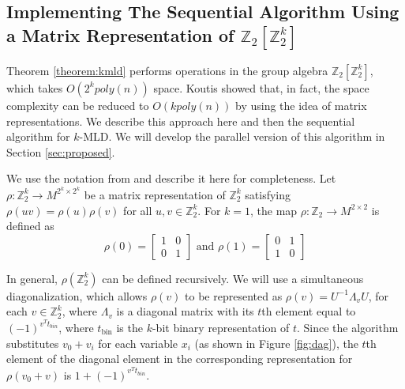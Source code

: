 

\subsection{Implementing The Sequential Algorithm Using a Matrix Representation
of $\mathbb{Z}_2[\mathbb{Z}_2^k]$}

Theorem \ref{theorem:kmld} performs operations in the group algebra $\mathbb{Z}_2[\mathbb{Z}_2^k]$,
which takes $O(2^k poly(n))$ space. Koutis \cite{koutis:icalp08} showed that, in fact, the space
complexity can be reduced to $O(k poly(n))$ by using the idea of matrix representations.
We describe this approach here and then the sequential algorithm \maxwt{}
for $k$-MLD. We will develop the parallel version of this algorithm in 
Section \ref{sec:proposed}.

We use the notation from \cite{koutis:icalp08} and describe it here for completeness.
Let $\rho:\mathbb{Z}_2^k\rightarrow M^{2^k\times 2^k}$ be a matrix representation of
$\mathbb{Z}_2^k$ satisfying $\rho(uv)=\rho(u)\rho(v)$ for all $u, v\in \mathbb{Z}_2^k$.
For $k=1$, the map $\rho:\mathbb{Z}_2\rightarrow M^{2\times 2}$ is defined as
\[
\rho(0) = 
\begin{bmatrix}
1 & 0\\
0 & 1
\end{bmatrix}
\mbox{ and }
\rho(1) = 
\begin{bmatrix}
0 & 1\\
1 & 0
\end{bmatrix}
\]

In general, $\rho(\mathbb{Z}_2^k)$ can be defined recursively. We will use a
simultaneous diagonalization, which allows $\rho(v)$ to be represented as
$\rho(v) = U^{-1}\Lambda_v U$, for each $v\in \mathbb{Z}_2^k$, where $\Lambda_v$ is
a diagonal matrix with its $t$th element equal to $(-1)^{v^T t_{bin}}$,
where $t_{\text{bin}}$ is the $k$-bit binary representation of $t$.
Since the algorithm substitutes $v_0+v_i$ for each variable $x_i$ (as shown in
Figure \ref{fig:dag}), the $t$th element of the diagonal element in the corresponding
representation for $\rho(v_0+v)$ is $1+(-1)^{v^T t_{bin}}$.

